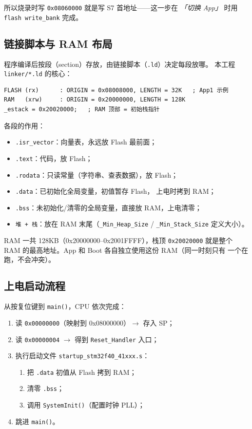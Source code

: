 所以烧录时写 \texttt{0x08060000} 就是写 S7 首地址——这一步在
\emph{「切换 App」} 时用 \texttt{flash write\_bank} 完成。

\subsection{链接脚本与 RAM 布局}

程序编译后按段（section）存放，由链接脚本（\texttt{.ld}）决定每段放哪。
本工程 \texttt{linker/*.ld} 的核心：

\begin{lstlisting}[style=generic]
FLASH (rx)      : ORIGIN = 0x08008000, LENGTH = 32K   ; App1 示例
RAM   (xrw)     : ORIGIN = 0x20000000, LENGTH = 128K
_estack = 0x20020000;   ; RAM 顶部 = 初始栈指针
\end{lstlisting}

各段的作用：

\begin{itemize}
  \item \texttt{.isr\_vector}：向量表，永远放 Flash 最前面；
  \item \texttt{.text}：代码，放 Flash；
  \item \texttt{.rodata}：只读常量（字符串、查表数据），放 Flash；
  \item \texttt{.data}：已初始化全局变量，初值暂存 Flash，
        上电时拷到 RAM；
  \item \texttt{.bss}：未初始化/清零的全局变量，直接放 RAM，上电清零；
  \item \texttt{堆 + 栈}：放在 RAM 末尾（\texttt{\_Min\_Heap\_Size} /
        \texttt{\_Min\_Stack\_Size} 定义大小）。
\end{itemize}

RAM 一共 128KB（0x20000000--0x2001FFFF），栈顶 \texttt{0x20020000}
就是整个 RAM 的最高地址。App 和 Boot 各自独立使用这份 RAM（同一时刻只有
一个在跑，不会冲突）。

\subsection{上电启动流程}

从按复位键到 \texttt{main()}，CPU 依次完成：

\begin{enumerate}
  \item 读 \texttt{0x00000000}（映射到 0x08000000）$\to$ 存入 SP；
  \item 读 \texttt{0x00000004} $\to$ 得到 \texttt{Reset\_Handler} 入口；
  \item 执行启动文件 \texttt{startup\_stm32f40\_41xxx.s}：
        \begin{enumerate}
          \item 把 \texttt{.data} 初值从 Flash 拷到 RAM；
          \item 清零 \texttt{.bss}；
          \item 调用 \texttt{SystemInit()}（配置时钟 PLL）；
        \end{enumerate}
  \item 跳进 \texttt{main()}。
\end{enumerate}

